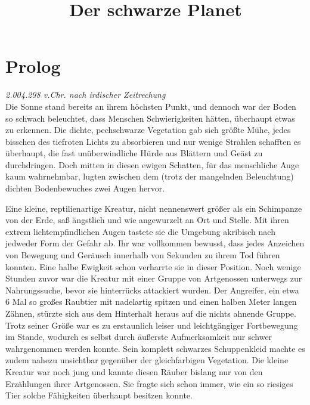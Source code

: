 \documentclass[a4paper,11pt]{book}
\title{Der schwarze Planet}
\begin{document}
\maketitle

\chapter{Prolog}
\textit{2.004.298 v.Chr. nach irdischer Zeitrechung}
\\

Die Sonne stand bereits an ihrem höchsten Punkt, und dennoch war der Boden so schwach beleuchtet, dass Menschen Schwierigkeiten hätten, überhaupt etwas zu erkennen. Die dichte, pechschwarze Vegetation gab sich größte Mühe, jedes bisschen des tiefroten Lichts zu absorbieren und nur wenige Strahlen schafften es überhaupt, die fast unüberwindliche Hürde aus Blättern und Geäst zu durchdringen. Doch mitten in diesen ewigen Schatten, für das menschliche Auge kaum wahrnehmbar, lugten zwischen dem (trotz der mangelnden Beleuchtung) dichten Bodenbewuches zwei Augen hervor.

Eine kleine, reptilienartige Kreatur, nicht nennenswert größer als ein Schimpanze von der Erde, saß ängstlich und wie angewurzelt an Ort und Stelle. Mit ihren extrem lichtempfindlichen Augen tastete sie die Umgebung akribisch nach jedweder Form der Gefahr ab. Ihr war vollkommen bewusst, dass jedes Anzeichen von Bewegung und Geräusch innerhalb von Sekunden zu ihrem Tod führen konnten. Eine halbe Ewigkeit schon verharrte sie in dieser Position. Noch wenige Stunden zuvor war die Kreatur mit einer Gruppe von Artgenossen unterwegs zur Nahrungssuche, bevor sie hinterrücks attackiert wurden. Der Angreifer, ein etwa 6 Mal so großes Raubtier mit nadelartig spitzen und einen halben Meter langen Zähnen, stürzte sich aus dem Hinterhalt heraus auf die nichts ahnende Gruppe. Trotz seiner Größe war es zu erstaunlich leiser und leichtgängiger Fortbewegung im Stande, wodurch es selbst durch äußerste Aufmerksamkeit nur schwer wahrgenommen werden konnte. Sein komplett schwarzes Schuppenkleid machte es zudem nahezu unsichtbar gegenüber der gleichfarbigen Vegetation. Die kleine Kreatur war noch jung und kannte diesen Räuber bislang nur von den Erzählungen ihrer Artgenossen. Sie fragte sich schon immer, wie ein so riesiges Tier solche Fähigkeiten überhaupt besitzen konnte.
\end{document}
